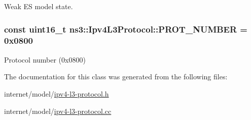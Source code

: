 Weak ES model state. 

\subsubsection[{\texorpdfstring{P\+R\+O\+T\+\_\+\+N\+U\+M\+B\+ER}{PROT_NUMBER}}]{\setlength{\rightskip}{0pt plus 5cm}const uint16\+\_\+t ns3\+::\+Ipv4\+L3\+Protocol\+::\+P\+R\+O\+T\+\_\+\+N\+U\+M\+B\+ER = 0x0800\hspace{0.3cm}{\ttfamily [static]}}\hypertarget{classns3_1_1Ipv4L3Protocol_a0146bc84815b7b73adb9c62cdafc9442}{}\label{classns3_1_1Ipv4L3Protocol_a0146bc84815b7b73adb9c62cdafc9442}


Protocol number (0x0800) 



The documentation for this class was generated from the following files\+:\begin{DoxyCompactItemize}
\item 
internet/model/\hyperlink{ipv4-l3-protocol_8h}{ipv4-\/l3-\/protocol.\+h}\item 
internet/model/\hyperlink{ipv4-l3-protocol_8cc}{ipv4-\/l3-\/protocol.\+cc}\end{DoxyCompactItemize}
